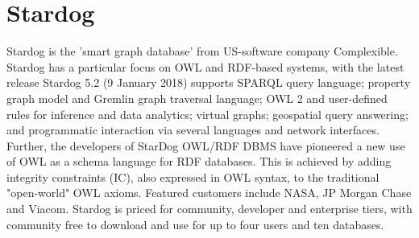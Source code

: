 \section{Stardog}
Stardog is the 'smart graph database' from US-software company Complexible.
Stardog has a particular focus on OWL and RDF-based systems, with the latest
release Stardog 5.2 (9 January 2018) supports SPARQL query language; property
graph model and Gremlin graph traversal language; OWL 2 and user-defined rules
for inference and data analytics; virtual graphs; geospatial query answering;
and programmatic interaction via several languages and network interfaces.
\cite{stardog-docs} Further, the developers of StarDog OWL/RDF DBMS have
pioneered a new use of OWL as a schema language for RDF databases. This is
achieved by adding integrity constraints (IC), also expressed in OWL syntax,
to the traditional "open-world" OWL axioms.\cite{stardog-schema} Featured
customers include NASA, JP Morgan Chase and Viacom. Stardog is priced for
community, developer and enterprise tiers, with community free to download
and use for up to four users and ten databases.\cite{stardog-computerword}
 
 

